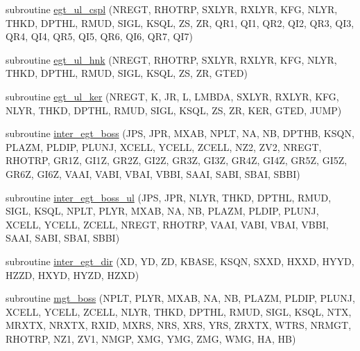 \begin{DoxyCompactItemize}
subroutine \hyperlink{Leroi_8f90_a55b57146ea180fed3080a010421620fe}{egt\+\_\+ul\+\_\+cspl} (N\+R\+E\+GT, R\+H\+O\+T\+RP, S\+X\+L\+YR, R\+X\+L\+YR, K\+FG, N\+L\+YR, T\+H\+KD, D\+P\+T\+HL, R\+M\+UD, S\+I\+GL, K\+S\+QL, ZS, ZR, Q\+R1, Q\+I1, Q\+R2, Q\+I2, Q\+R3, Q\+I3, Q\+R4, Q\+I4, Q\+R5, Q\+I5, Q\+R6, Q\+I6, Q\+R7, Q\+I7)
\item 
subroutine \hyperlink{Leroi_8f90_a1d1da4021109f56adcc9ad84d89cd1b7}{egt\+\_\+ul\+\_\+hnk} (N\+R\+E\+GT, R\+H\+O\+T\+RP, S\+X\+L\+YR, R\+X\+L\+YR, K\+FG, N\+L\+YR, T\+H\+KD, D\+P\+T\+HL, R\+M\+UD, S\+I\+GL, K\+S\+QL, ZS, ZR, G\+T\+ED)
\item 
subroutine \hyperlink{Leroi_8f90_a8f7098d7bc36902fbbda312874c15120}{egt\+\_\+ul\+\_\+ker} (N\+R\+E\+GT, K, JR, L, L\+M\+B\+DA, S\+X\+L\+YR, R\+X\+L\+YR, K\+FG, N\+L\+YR, T\+H\+KD, D\+P\+T\+HL, R\+M\+UD, S\+I\+GL, K\+S\+QL, ZS, ZR, K\+ER, G\+T\+ED, J\+U\+MP)
\item 
subroutine \hyperlink{Leroi_8f90_a784bd3a2054098804d271da41cb44b09}{inter\+\_\+egt\+\_\+boss} (J\+PS, J\+PR, M\+X\+AB, N\+P\+LT, NA, NB, D\+P\+T\+HB, K\+S\+QN, P\+L\+A\+ZM, P\+L\+D\+IP, P\+L\+U\+NJ, X\+C\+E\+LL, Y\+C\+E\+LL, Z\+C\+E\+LL, N\+Z2, Z\+V2, N\+R\+E\+GT, R\+H\+O\+T\+RP, G\+R1Z, G\+I1Z, G\+R2Z, G\+I2Z, G\+R3Z, G\+I3Z, G\+R4Z, G\+I4Z, G\+R5Z, G\+I5Z, G\+R6Z, G\+I6Z, V\+A\+AI, V\+A\+BI, V\+B\+AI, V\+B\+BI, S\+A\+AI, S\+A\+BI, S\+B\+AI, S\+B\+BI)
\item 
subroutine \hyperlink{Leroi_8f90_ae92f09c8cb5ab0bcf37a78e555f55025}{inter\+\_\+egt\+\_\+boss\+\_\+ul} (J\+PS, J\+PR, N\+L\+YR, T\+H\+KD, D\+P\+T\+HL, R\+M\+UD, S\+I\+GL, K\+S\+QL, N\+P\+LT, P\+L\+YR, M\+X\+AB, NA, NB, P\+L\+A\+ZM, P\+L\+D\+IP, P\+L\+U\+NJ, X\+C\+E\+LL, Y\+C\+E\+LL, Z\+C\+E\+LL, N\+R\+E\+GT, R\+H\+O\+T\+RP, V\+A\+AI, V\+A\+BI, V\+B\+AI, V\+B\+BI, S\+A\+AI, S\+A\+BI, S\+B\+AI, S\+B\+BI)
\item 
subroutine \hyperlink{Leroi_8f90_ab648c76e3422d73a3d9c0530c4a77dd5}{inter\+\_\+egt\+\_\+dir} (XD, YD, ZD, K\+B\+A\+SE, K\+S\+QN, S\+X\+XD, H\+X\+XD, H\+Y\+YD, H\+Z\+ZD, H\+X\+YD, H\+Y\+ZD, H\+Z\+XD)
\item 
subroutine \hyperlink{Leroi_8f90_a4bfc3438dc7d8469c5ec8f1888d7fc50}{mgt\+\_\+boss} (N\+P\+LT, P\+L\+YR, M\+X\+AB, NA, NB, P\+L\+A\+ZM, P\+L\+D\+IP, P\+L\+U\+NJ, X\+C\+E\+LL, Y\+C\+E\+LL, Z\+C\+E\+LL, N\+L\+YR, T\+H\+KD, D\+P\+T\+HL, R\+M\+UD, S\+I\+GL, K\+S\+QL, N\+TX, M\+R\+X\+TX, N\+R\+X\+TX, R\+X\+ID, M\+X\+RS, N\+RS, X\+RS, Y\+RS, Z\+R\+X\+TX, W\+T\+RS, N\+R\+M\+GT, R\+H\+O\+T\+RP, N\+Z1, Z\+V1, N\+M\+GP, X\+MG, Y\+MG, Z\+MG, W\+MG, HA, HB)

\end{DoxyCompactItemize}
